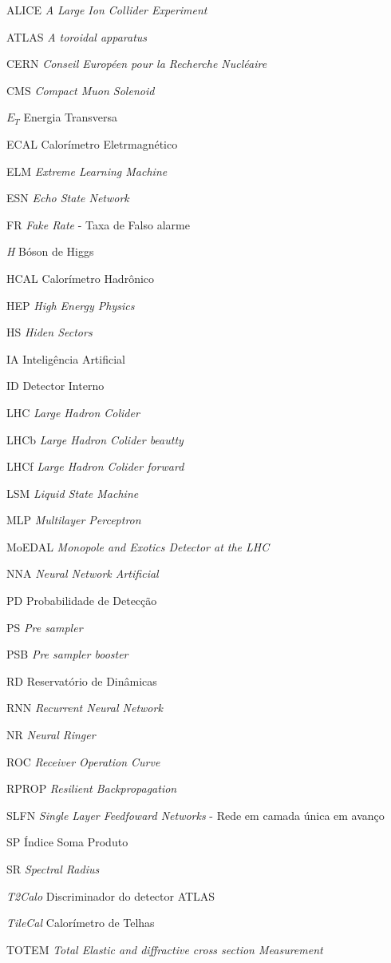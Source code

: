 \begin{siglas}			
	\item[ALICE] \textit{A Large Ion Collider Experiment}
	\item[ATLAS]	\textit{A toroidal apparatus}
	\item[CERN]	\textit{Conseil Européen pour la Recherche Nucléaire}
	\item[CMS]	\textit{Compact Muon Solenoid}
	\item[$E_T$]	Energia Transversa
	\item[ECAL]	Calorímetro Eletrmagnético
	\item[ELM]	\textit{Extreme Learning Machine}
	\item[ESN]	\textit{Echo State Network}
	\item[FR]	\textit{Fake Rate} - Taxa de Falso alarme
	\item[\textit{H}] Bóson de Higgs
	\item[HCAL]	Calorímetro Hadrônico
	\item[HEP]  \textit{High Energy Physics}
	\item[HS]	\textit{Hiden Sectors}
	\item[IA]	Inteligência Artificial
	\item[ID]	Detector Interno
	\item[LHC]	\textit{Large Hadron Colider}
	\item[LHCb]	\textit{Large Hadron Colider beautty}
	\item[LHCf]	\textit{Large Hadron Colider forward}
	\item[LSM]	\textit{Liquid State Machine}
	\item[MLP]	\textit{Multilayer Perceptron}
	\item[MoEDAL]	\textit{Monopole and Exotics Detector at the LHC }
	\item[NNA]	\textit{Neural Network Artificial}
	\item[PD]	Probabilidade de Detecção
	\item[PS]	\textit{Pre sampler}
	\item[PSB]	\textit{Pre sampler booster}
	\item[RD]	Reservatório de Dinâmicas
	\item[RNN]	\textit{Recurrent Neural Network}
	\item[NR] \textit{Neural Ringer}
	\item[ROC]	\textit{Receiver Operation Curve}
	\item[RPROP]	\textit{Resilient Backpropagation}
	\item[SLFN]	\textit{Single Layer Feedfoward Networks} - Rede em camada única em avanço
	\item[SP]	Índice Soma Produto
	\item[SR]	\textit{Spectral Radius}
	\item[\textit{T2Calo}]	Discriminador do detector ATLAS
	\item[\textit{TileCal}]	Calorímetro de Telhas
	\item[TOTEM]	\textit{Total Elastic and diffractive cross section Measurement}

\end{siglas}

